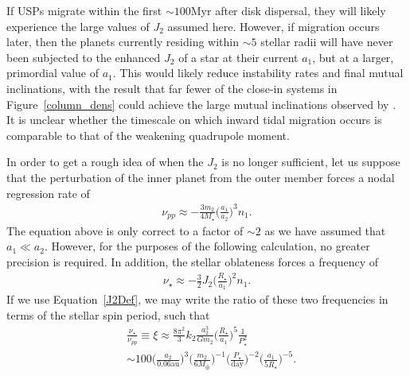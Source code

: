 \documentclass[twocolumn]{aastex63}
\begin{document}
If USPs migrate within the first $\sim 100$Myr after disk dispersal, they will likely experience the large values of $J_2$ assumed here. However, if migration occurs later, then the planets currently residing within $\sim 5$ stellar radii will have never been subjected to the enhanced $J_2$ of a star at their current $a_1$, but at a larger, primordial value of $a_1$. This would likely reduce instability rates and final mutual inclinations, with the result that far fewer of the close-in systems in Figure~\ref{column_dens} could achieve the large mutual inclinations observed by \cite{dai2018larger}. It is unclear whether the timescale on which inward tidal migration occurs is comparable to that of the weakening quadrupole moment.

In order to get a rough idea of when the $J_2$ is no longer sufficient, let us suppose that the perturbation of the inner planet from the outer member forces a nodal regression rate of \citep{murray1999solar}
\begin{align}
\nu_{pp}\approx - \frac{3 m_2}{4 M_\star}\bigg(\frac{a_1}{a_2}\bigg)^3 n_1.
\end{align}
The equation above is only correct to a factor of $\sim 2$ as we have assumed that $a_1\ll a_2$. However, for the purposes of the following calculation, no greater precision is required. In addition, the stellar oblateness forces a frequency of
\begin{align}\label{Stellar_Potential}
\nu_{\star}\approx - \frac{3}{2}J_2 \bigg(\frac{R_\star}{a_1}\bigg)^2 n_1.
\end{align}
If we use Equation~\ref{J2Def}, we may write the ratio of these two frequencies in terms of the stellar spin period, such that
\begin{align}
    &\frac{\nu_\star}{\nu_{pp}}\equiv \xi\approx\frac{8\pi^2}{3}k_2 \frac{a_2^3}{Gm_2}\bigg(\frac{R_\star}{a_1}\bigg)^5\frac{1}{P_\star^2}\nonumber\\
    &\sim 100\bigg(\frac{a_2}{0.06\textrm{au}}\bigg)^{3}\bigg(\frac{m_2}{6M_\oplus}\bigg)^{-1} \bigg(\frac{P_\star}{\textrm{day}}\bigg)^{-2} \bigg(\frac{a_1}{5R_\star}\bigg)^{-5}.
\end{align}
\end{document}
